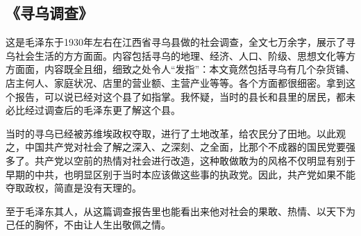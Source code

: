 \subsection{《寻乌调查》}

这是毛泽东于1930年左右在江西省寻乌县做的社会调查，全文七万余字，展示了寻乌社会生活的方方面面。内容包括寻乌的地理、经济、人口、阶级、思想文化等方方面面，内容既全且细，细致之处令人“发指”：本文竟然包括寻乌有几个杂货铺、店主何人、家庭状况、店里的营业额、主营产业等等。各个方面都很细密。拿到这个报告，可以说已经对这个县了如指掌。我怀疑，当时的县长和县里的居民，都未必比经过调查后的毛泽东更了解这个县。

当时的寻乌已经被苏维埃政权夺取，进行了土地改革，给农民分了田地。以此观之，中国共产党对社会了解之深入、之深刻、之全面，比那个不成器的国民党要强多了。共产党以空前的热情对社会进行改造，这种敢做敢为的风格不仅明显有别于早期的中共，也明显区别于当时本应该做这些事的执政党。因此，共产党如果不能夺取政权，简直是没有天理的。

至于毛泽东其人，从这篇调查报告里也能看出来他对社会的果敢、热情、以天下为己任的胸怀，不由让人生出敬佩之情。